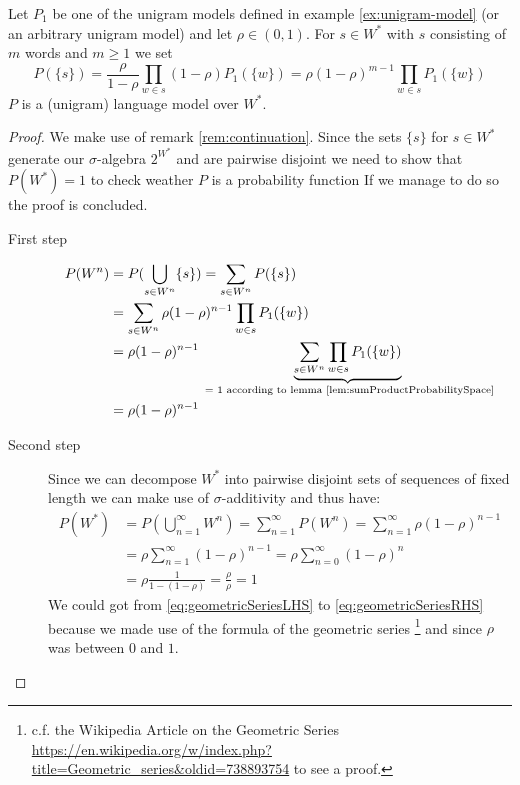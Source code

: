 \documentclass[•]{book}
\begin{document}
\begin{theorem}\label{thm:unigram-lm}
Let $P_1$ be one of the unigram models defined in example \ref{ex:unigram-model} (or an arbitrary unigram model) and let $\rho \in (0,1)$.
For $s\in W^{*}$ with $s$ consisting of $m$ words and $m\geq 1$ we set
\begin{equation}
P(\{s\}) = \frac{\rho}{1-\rho}\prod_{w\in s}(1-\rho)P_1(\{w\}) =  \rho(1-\rho)^{m-1}\prod_{w\in s}P_1(\{w\})
\end{equation}
$P$ is a (unigram) language model over $W^{*}$.
\begin{proof}
We make use of remark \ref{rem:continuation}. 
Since the sets $\{s\}$ for $s\in W^{*}$ generate our $\sigma$-algebra $2^{W^{*}}$ and are pairwise disjoint we need to show that $P(W^{*})=1$ to check weather $P$ is a probability function 
If we manage to do so the proof is concluded.

\begin{description}
\item[First step] 
\begin{align}
P(W^n) & = P(\bigcup_{s\in W^n} \{s\}) = \sum_{s\in W^n}P(\{s\}) \\
 & = \sum_{s\in W^n}\rho(1-\rho)^{n-1}\prod_{w\in s}P_1(\{w\}) \\
 & = \rho(1-\rho)^{n-1} \underbrace{\sum_{s\in W^n}\prod_{w\in s}P_1(\{w\})}_{\text{ = 1 according to lemma \ref{lem:sumProductProbabilitySpace}}} \\
 & = \rho(1-\rho)^{n-1}
\end{align}

\item[Second step] Since we can decompose $W^{*}$ into pairwise disjoint sets of sequences of fixed length we can make use of $\sigma$-additivity and thus have: 
\begin{align}
P(W^{*}) & = P(\bigcup_{n=1}^\infty W^n) = \sum_{n=1}^\infty P(W^n) = \sum_{n=1}^\infty \rho(1-\rho)^{n-1} \\
 & =  \rho \sum_{n=1}^\infty(1-\rho)^{n-1} = \rho \sum_{n=0}^\infty(1-\rho)^{n} \label{eq:geometricSeriesLHS} \\
 &  = \rho \frac{1}{1-(1-\rho)} = \frac{\rho}{\rho} = 1 \label{eq:geometricSeriesRHS}
\end{align}
We could got from \ref{eq:geometricSeriesLHS} to \ref{eq:geometricSeriesRHS} because we made use of the formula of the geometric series \footnote{c.f. the Wikipedia Article on the Geometric Series \url{https://en.wikipedia.org/w/index.php?title=Geometric_series&oldid=738893754} to see a proof. } and since $\rho$ was between $0$ and $1$.
\end{description} 
\end{proof}
\end{theorem}
\end{document}
